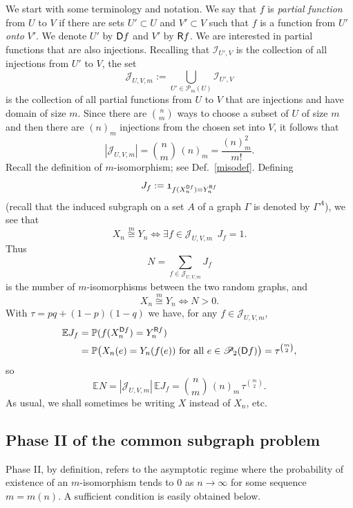 \documentclass[reqno]{amsart}
\theoremstyle{theorem}
\theoremstyle{definition}
\theoremstyle{remark}
\def\P{\mathbb{P}}
\def\E{\mathbb{E}}
\def\PP{\mathscr{P}}
\newcommand{\1}{{\text{\Large $\mathfrak 1$}}}	%
\numberwithin{equation}{section}
\def\II{\mathscr I}
\def\JJ{\mathscr J}
\newcommand{\I}{{\text{\Large $\mathfrak 1$}}}	%
\def\ran{{\sf R}}
\def\dom{{\sf D}}
\newcommand{\jso}[1]{\stackrel{#1}{\cong}}
\begin{document}
We start with some terminology and notation.
We say that $f$ is {\em partial function} from $U$ to $V$
if there are sets $U' \subset U$ and $V' \subset V$ such that
$f$ is a function from $U'$ {\em onto} $V'$. We denote $U'$ by $\dom f$
and $V'$ by $\ran f$.
We are interested in partial functions that are also injections.
Recalling that $\II_{U',V}$ is the collection of all injections 
from $U'$ to $V$, the set
\[
\JJ_{U,V,m} := \bigcup_{U' \in \PP_m(U)} \II_{U',V}
\]
is the collection of all partial functions 
from $U$ to $V$ that are injections and have domain of size $m$.
Since there are $n \choose m$ ways to choose a subset of $U$ of size $m$
and then there are $(n)_m$ injections from the chosen set into $V$, it
follows that
\begin{equation}
\label{JJsize}
|\JJ_{U,V,m}| = \binom{n}{m} \, (n)_m = \frac{(n)_m^2}{m!}.
\end{equation}
Recall the definition of $m$-isomorphism; see Def.\ \ref{misodef}.
Defining
\begin{equation}
\label{Jf}
J_f := \I_{f (X_n^{\dom f}) = Y_n^{\ran f}}
\end{equation}
(recall that the induced subgraph on a set $A$ of a graph $\Gamma$ is denoted by $\Gamma^A$),
we see that
\[
X_n \jso{m} Y_n \iff \exists f \in \JJ_{U,V,m} ~~ J_f=1.
\]
Thus
\begin{equation} \label{NN1}
N = \sum_{f \in \JJ_{U,V,m}} 
J_f
\end{equation}
is the number of $m$-isomorphisms between the two random graphs,
and
\[
X_n \jso{m} Y_n \iff N>0.
\]
With $\tau=pq+(1-p)(1-q)$ we have, for any $f \in \JJ_{U,V,m}$,
\begin{align*}
\E J_f 
&= \P(f (X_n^{\dom f}) = Y_n^{\ran f}) 
\\
& = \P\big(X_n(e) = Y_n(f(e)) \text{ for all } e \in \PP_2(\dom f)\big)
= \tau^{\binom{m}{2}},
\end{align*}
so
\begin{equation}
\label{crito}
\E N = |\JJ_{U,V,m}|\, \E J_f
=  \binom{n}{m} \, (n)_m\, \tau^{\binom{m}{2}}.
\end{equation}
As usual, we shall sometimes be writing $X$ instead of $X_n$, etc. 


\subsection{\bfseries Phase II of the common subgraph problem}
Phase II, by definition, refers to the asymptotic regime
where the probability of existence of an $m$-isomorphism
tends to $0$ as $n \to \infty$ for some sequence $m=m(n)$.
A sufficient condition is easily obtained below.
\end{document}

